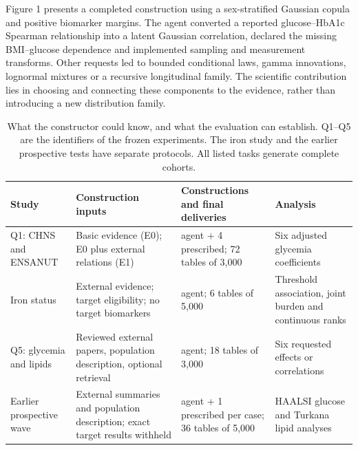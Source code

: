 \documentclass[sigconf,review]{acmart}
\begin{document}
Figure 1 presents a completed construction using a sex-stratified Gaussian copula and positive biomarker margins. The agent converted a reported glucose–\allowbreak{}HbA1c Spearman relationship into a latent Gaussian correlation, declared the missing BMI–\allowbreak{}glucose dependence and implemented sampling and measurement transforms. Other requests led to bounded conditional laws, gamma innovations, lognormal mixtures or a recursive longitudinal family. The scientific contribution lies in choosing and connecting these components to the evidence, rather than introducing a new distribution family.


\begin{table}[tp]

\caption{What the constructor could know, and what the evaluation can establish. Q1–\allowbreak{}Q5 are the identifiers of the frozen experiments. The iron study and the earlier prospective tests have separate protocols. All listed tasks generate complete cohorts.}

\label{tab:2}

\centering\small

\renewcommand{\arraystretch}{1.12}

\begin{tabularx}{\textwidth}{@{}>{\raggedright\arraybackslash}X>{\raggedright\arraybackslash}X>{\raggedright\arraybackslash}X>{\raggedright\arraybackslash}X@{}}

\toprule

Study & Construction inputs & Constructions and final deliveries & Analysis \\

\midrule

Q1: CHNS and ENSANUT & Basic evidence (E0); E0 plus external relations (E1) & 20 agent + 4 prescribed; 72 tables of 3,000 & Six adjusted glycemia coefficients \\

Iron status & External evidence; target eligibility; no target biomarkers & 2 agent; 6 tables of 5,000 & Threshold association, joint burden and continuous ranks \\

Q5: glycemia and lipids & Reviewed external papers, population description, optional retrieval & 6 agent; 18 tables of 3,000 & Six requested effects or correlations \\

Earlier prospective wave & External summaries and population description; exact target results withheld & 5 agent + 1 prescribed per case; 36 tables of 5,000 & HAALSI glucose and Turkana lipid analyses \\


\end{tabularx}
\end{table}
\end{document}
